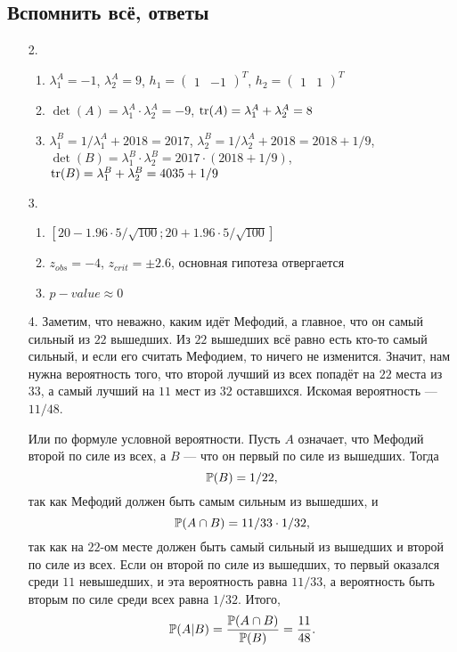 \subsection{Вспомнить всё, ответы}

\begin{enumerate}
\item[2.]
\begin{enumerate}
  \item $\lambda^A_1 = -1$, $\lambda^A_2 = 9$,
  $h_1 = \begin{pmatrix}
  1 & -1
  \end{pmatrix}^T$,
  $h_2 = \begin{pmatrix}
  1 & 1
  \end{pmatrix}^T$
  \item $\det(A) = \lambda^A_1 \cdot \lambda^A_2 = -9$, $\tr(A) = \lambda^A_1 +
  \lambda^A_2 = 8$
  \item $\lambda^B_1 = 1 / \lambda^A_1 + 2018 = 2017$,
  $\lambda^B_2 = 1 / \lambda^A_2 + 2018 = 2018 + 1/9$,
  $\det(B) = \lambda^B_1 \cdot \lambda^B_2 = 2017 \cdot (2018 + 1/9)$,
  $\tr(B) = \lambda^B_1 + \lambda^B_2 = 4035 + 1/9$
\end{enumerate}
\item[3.]
\begin{enumerate}
\item $\left[20 - 1.96 \cdot 5 / \sqrt{100}; 20 + 1.96 \cdot 5 / \sqrt{100} \right]$
\item $z_{obs} = -4$, $z_{crit} = \pm 2.6$, основная гипотеза отвергается
\item $p-value \approx 0 $
\end{enumerate}
\item[4.] Заметим, что неважно, каким идёт Мефодий, а главное, что он самый сильный из
$22$ вышедших. Из $22$ вышедших всё равно есть кто-то самый сильный, и если его
считать Мефодием, то ничего не изменится. Значит, нам нужна вероятность того,
что второй лучший из всех попадёт на $22$ места из $33$, а самый лучший на $11$
мест из $32$ оставшихся. Искомая вероятность — $11/48$.

Или по формуле условной вероятности. Пусть $A$ означает, что Мефодий второй по силе
из всех, а $B$ — что он первый по силе из вышедших. Тогда
\[
\P(B) = 1/22,
\]
так как Мефодий должен быть самым сильным из вышедших, и
\[
\P(A \cap B) = 11/33 \cdot 1/32,
\]
так как на $22$-ом месте должен быть самый сильный из вышедших и второй по силе из
всех. Если он второй по силе из вышедших, то первый оказался среди $11$ невышедших,
и эта вероятность равна $11/33$, а вероятность быть вторым по силе среди всех равна
$1/32$. Итого,
\[
\P(A|B) = \frac{\P(A \cap B)}{\P(B)} = \frac{11}{48}.
\]
\end{enumerate}



